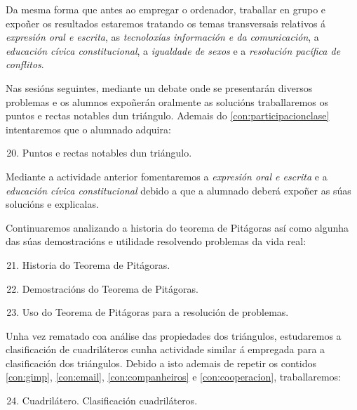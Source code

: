 Da mesma forma que antes ao empregar o ordenador, traballar en grupo e expoñer os resultados estaremos tratando os temas transversais relativos á \emph{expresión oral e escrita}, as \emph{tecnoloxías información e da comunicación}, a \emph{educación cívica constitucional}, a \emph{igualdade de sexos} e a \emph{resolución pacífica de conflitos}.

Nas sesións seguintes, mediante un debate onde se presentarán diversos problemas e os alumnos expoñerán oralmente as solucións traballaremos os puntos e rectas notables dun triángulo. Ademais do \ref{con:participacionclase} intentaremos que o alumnado adquira:

\begin{enumerate}[label=\bfseries Con\arabic*, align=left, leftmargin=1.5cm]
  \setcounter{enumi}{19}
  \item\label{con:puntosrectasnotables} Puntos e rectas notables dun triángulo.
\end{enumerate}

Mediante a actividade anterior fomentaremos a \emph{expresión oral e escrita} e a \emph{educación cívica constitucional} debido a que a alumnado deberá expoñer as súas solucións e explicalas.

Continuaremos analizando a historia do teorema de Pitágoras así como algunha das súas demostracións e utilidade resolvendo problemas da vida real:

\begin{enumerate}[label=\bfseries Con\arabic*, align=left, leftmargin=1.5cm]
  \setcounter{enumi}{20}
  \item\label{con:histpitag} Historia do Teorema de Pitágoras.
  \item\label{con:dempitag} Demostracións do Teorema de Pitágoras.
  \item\label{con:problepitag} Uso do Teorema de Pitágoras para a resolución de problemas.
\end{enumerate}

Unha vez rematado coa análise das propiedades dos triángulos, estudaremos a clasificación de cuadriláteros cunha actividade similar á empregada para a clasificación dos triángulos. Debido a isto ademais de repetir os contidos \ref{con:gimp}, \ref{con:email}, \ref{con:companheiros} e \ref{con:cooperacion}, traballaremos:

\begin{enumerate}[label=\bfseries Con\arabic*, align=left, leftmargin=1.5cm]
  \setcounter{enumi}{23}
  \item\label{con:cuadrilateros} Cuadrilátero. Clasificación cuadriláteros.
\end{enumerate}

